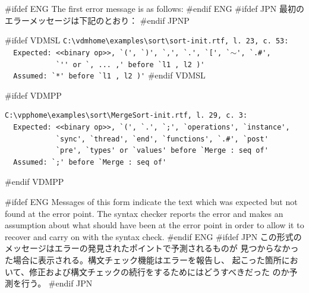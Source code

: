 \documentclass[\pformat,12pt]{article}
\newcommand{\vdmhome}{vdmhome}
\newcommand{\vdmhome}{vpphome}
\begin{document}
#ifdef ENG
The first error message is as follows:
#endif ENG
#ifdef JPN
最初のエラーメッセージは下記のとおり：
#endif JPNP

#ifdef VDMSL
\verb!C:\vdmhome\examples\sort\sort-init.rtf, l. 23, c. 53:! \\
  \verb!  Expected: <<binary op>>, `(', `)', `,', `.', `[', `!{\tt $\sim$}\verb!', `.#', ! \\
  \verb!            `'' or `, ... ,' before `l1 , l2 )'! \\
  \verb!  Assumed: `*' before `l1 , l2 )'!
#endif VDMSL

#ifdef VDMPP
\begin{verbatim}
C:\vpphome\examples\sort\MergeSort-init.rtf, l. 29, c. 3:
  Expected: <<binary op>>, `(', `.', `;', `operations', `instance',
            `sync', `thread', `end', `functions', `.#', `post'
            `pre', `types' or `values' before `Merge : seq of'
  Assumed: `;' before `Merge : seq of'
\end{verbatim}
#endif VDMPP

#ifdef ENG
Messages of this form indicate the text which was expected but not
found at the error point. The syntax checker reports the error and
makes an assumption about what should have been at the error point in
order to allow it to recover and carry on with the syntax check.
#endif ENG
#ifdef JPN
この形式のメッセージはエラーの発見されたポイントで予測されるものが
見つからなかった場合に表示される。構文チェック機能はエラーを報告し、
起こった箇所において、修正および構文チェックの続行をするためにはどうすべきだった
のか予測を行う。
#endif JPN
\end{document}
